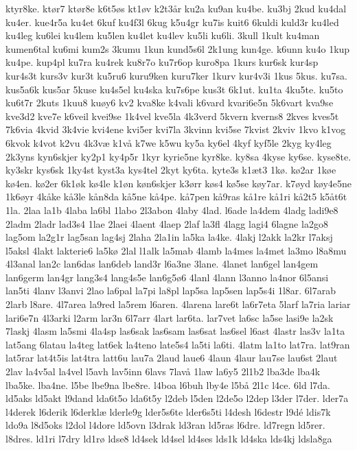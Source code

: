 {ktyr8ke.
ktør7
ktør8e
k6t5øs
kt1øv
k2t3år
ku2a
ku9an
ku4be.
ku3bj
2kud
ku4dal
ku4er.
kue4r5a
ku4et
6kuf
ku4f3l
6kug
k5u4gr
ku7is
kuit6
6kuldi
kuld3r
ku4led
ku4leg
ku6lei
ku4lem
ku5len
ku4let
ku4lev
ku5li
ku6li.
3kull
1kult
ku4man
kumen6tal
ku6mi
kum2s
3kumu
1kun
kund5s6l
2k1ung
kun4ge.
k6unn
ku4o
1kup
ku4pe.
kup4pl
ku7ra
ku4rek
ku8r7o
ku7r6op
kuro8pa
1kurs
kur6sk
kur4sp
kur4s3t
kurs3v
kur3t
ku5ru6
kuru9ken
kuru7ker
1kurv
kur4v3i
1kus
5kus.
ku7sa.
kus5a6k
kus5ar
5kuse
ku4s5el
ku4ska
ku7s6pe
kus3t
6k1ut.
ku1ta
4ku5te.
ku5to
ku6t7r
2kuts
1kuu8
kuøy6
kv2
kva8ke
k4vali
k6vard
kvari6e5n
5k6vart
kva9se
kve3d2
kve7e
k6veil
kvei9se
1k4vel
kve5la
4k3verd
5kvern
kverns8
2kves
kves5t
7k6via
4kvid
3k4vie
kvi4ene
kvi5er
kvi7la
3kvinn
kvi5se
7kvist
2kviv
1kvo
k1vog
6kvok
k4vot
k2vu
4k3væ
k1vå
k7we
k5wu
ky5a
ky6el
4kyf
kyf5le
2kyg
ky4leg
2k3yns
kyn6skjer
ky2p1
ky4p5r
1kyr
kyrie5ne
kyr8ke.
ky8sa
4kyse
ky6se.
kyse8te.
ky3skr
kys6sk
1ky4st
kyst3a
kys4tel
2kyt
ky6ta.
kyte3s
k1æt3
1kø.
kø2ar
1køe
kø4en.
kø2er
6k1øk
kø4le
k1øn
køn6skjer
k3ørr
køs4
kø5se
køy7ar.
k7øyd
køy4e5ne
1k6øyr
4kåke
kå3le
kån8da
kå5ne
kå4pe.
kå7pen
kå9ras
kå1re
kå1ri
kå2t5
k5åt6t
1la.
2laa
la1b
4laba
la6bl
1labo
2l3abon
4laby
4lad.
l6ade
la4dem
4ladg
ladi9e8
2ladm
2ladr
lad3s4
1lae
2laei
4laent
4laep
2laf
la3fl
4lagg
lagi4
6lagne
la2go8
lag5om
la2g1r
lag5san
lag4sj
2laha
2la1in
la5ka
la4ke.
4lakj
l2akk
la2kr
l7aksj
l5aksl
4lakt
lakterie6
la5kø
2lal
l1alk
la5mab
4lamb
la4mes
la4met
la3mo
l8a8mu
4l3anal
lan2c
lan6das
lan6deb
land3r
l6a3ne
3lane.
4lanet
lan6gel
lan4gem
lan6germ
lan4gr
lang3s4
lang4s5e
lan6g5ø6
4lanl
4lann
l3anno
la4nor
6l5ansi
lan5ti
4lanv
l3anvi
2lao
la6pal
la7pi
la8pl
lap5sa
lap5sen
lap5s4i
1l8ar.
6l7arab
2larb
l8are.
4l7area
la9red
la5rem
l6aren.
4larena
lare6t
la6r7eta
5larf
la7ria
lariar
lari6e7n
4l3arki
l2arm
lar3n
6l7arr
4lart
lar6ta.
lar7vet
la6sc
la5se
lasi9e
la2sk
7laskj
4lasm
la5smi
4la4sp
las6sak
las6sam
las6sat
las6sel
l6ast
4lastr
las3v
la1ta
lat5ang
6latau
la4teg
lat6ek
la4teno
late5s4
la5ti
la6ti.
4latm
la1to
lat7ra.
lat9ran
lat5rar
lat4t5is
lat4tra
latt6u
lau7a
2laud
laue6
4laun
4laur
lau7se
lau6st
2laut
2lav
la4v5al
la4vel
l5avh
lav5inn
6lavs
7lavå
1law
la6y5
2l1b2
lba3de
lba4k
lba5ke.
lba4ne.
l5be
lbe9na
lbe8re.
l4boa
l6buh
lby4e
l5bå
2l1c
l4ce.
6ld
l7da.
ld5aks
ld5akt
l9dand
lda6t5o
lda6t5y
l2deb
l5den
l2de5o
l2dep
l3der
l7der.
lder7a
l4derek
l6derik
l6derklæ
lderle9g
lder5s6te
lder6s5ti
l4desh
l6destr
l9dé
ldis7k
ldo9a
l8d5oks
l2dol
l4dore
ld5ovn
l3drak
ld3ran
ld5ras
l6dre.
ld7regn
ld5rer.
l8dres.
ld1ri
l7dry
ld1rø
ldse8
ld4sek
ld4sel
ld4ses
lds1k
ld4ska
lds4kj
ldsla8ga
}
